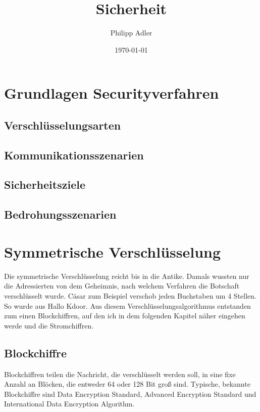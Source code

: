 \documentclass[11pt]{scrartcl}
\title{Sicherheit}
\author{Philipp Adler}
\date{\today{}}
\begin{document}
\maketitle
\tableofcontents
\pagebreak

\section{Grundlagen Securityverfahren}
\label{sec:basics-security-process}

\subsection{Verschlüsselungsarten}
\label{sec:ciphering types}

\subsection{Kommunikationsszenarien}
\label{sec:communication-scenarios}

\subsection{Sicherheitsziele}
\label{sec:security goals}

\subsection{Bedrohungsszenarien}
\label{sec:threat scenarios}


\section{Symmetrische Verschlüsselung}
\label{sec:symetric-ciphering}
Die symmetrische Verschlüsselung reicht bis in die Antike. Damals wussten nur die Adressierten von dem Geheimnis, nach welchem Verfahren die Botschaft verschlüsselt wurde. Cäsar zum Beispiel verschob jeden Buchstaben um 4 Stellen. So wurde aus Hallo Kdoor. Aus diesem Verschlüsselungsalgorithmus entstanden zum einen Blockchiffren, auf den ich in dem folgenden Kapitel näher eingehen werde und die Stromchiffren.\cite{1}

\subsection{Blockchiffre}
\label{sec:blockchiffre}
Blockchiffren teilen die Nachricht, die verschlüsselt werden soll, in eine fixe Anzahl an Blöcken, die entweder 64 oder 128 Bit groß sind. Typische, bekannte Blockchiffre sind Data Encryption Standard, Advanced Encryption Standard und International Data Encryption Algorithm.\cite{1}
\end{document}
